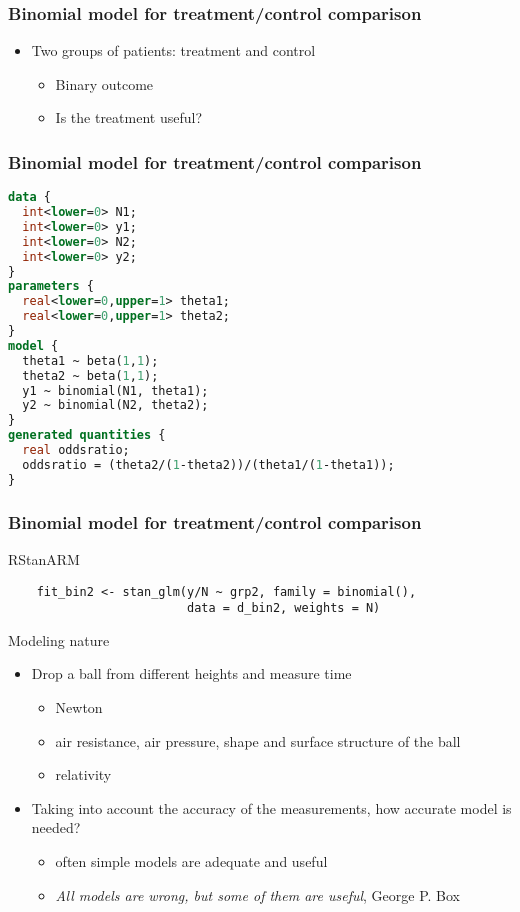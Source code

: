 \documentclass[10pt]{beamer}
\begin{document}
\begin{frame}[fragile]
  \frametitle{Binomial model for treatment/control comparison}

  \begin{itemize}
  \item Two groups of patients: treatment and control
    \begin{itemize}
    \item Binary outcome
    \item Is the treatment useful?
    \end{itemize}
  \end{itemize}

\end{frame}

\begin{frame}[fragile]
  \frametitle{Binomial model for treatment/control comparison}
  {\footnotesize
  \begin{lstlisting}[language=Stan]
data {
  int<lower=0> N1;
  int<lower=0> y1;
  int<lower=0> N2;
  int<lower=0> y2;
}
parameters {
  real<lower=0,upper=1> theta1;
  real<lower=0,upper=1> theta2;
}
model {
  theta1 ~ beta(1,1);
  theta2 ~ beta(1,1);
  y1 ~ binomial(N1, theta1);
  y2 ~ binomial(N2, theta2);
}
generated quantities {
  real oddsratio;
  oddsratio = (theta2/(1-theta2))/(theta1/(1-theta1));
}
  \end{lstlisting}
}
\end{frame}

\begin{frame}[fragile]
  \frametitle{Binomial model for treatment/control comparison}

  RStanARM
  {\scriptsize
  \begin{lstlisting}
    fit_bin2 <- stan_glm(y/N ~ grp2, family = binomial(),
                         data = d_bin2, weights = N)
  \end{lstlisting}
}
\end{frame}

\begin{frame}{Modeling nature}

  \begin{itemize}
  \item Drop a ball from different heights and measure time
    \pause
    \begin{itemize}
    \item Newton
    \item air resistance, air pressure, shape and surface structure of the ball
    \item relativity
    \end{itemize}
    \pause
  \item Taking into account the accuracy of the measurements, how
    accurate model is needed?
    \pause
    \begin{itemize}
    \item often simple models are adequate and useful
    \item \emph{All models are wrong, but some of them are useful},
      George P. Box
    \end{itemize}
  \end{itemize}

\end{frame}
\end{document}
